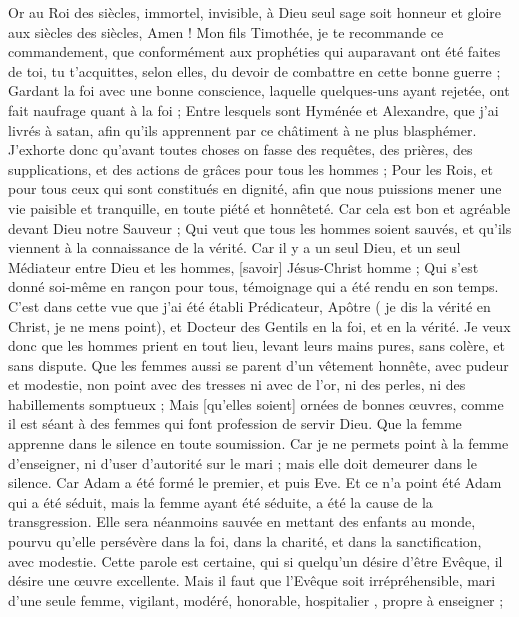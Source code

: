 \begin{multicols}{2}
Or au Roi des siècles, immortel, invisible, à Dieu seul sage soit honneur et gloire aux siècles des siècles, Amen !
Mon fils Timothée, je te recommande ce commandement, que conformément aux prophéties qui auparavant ont été faites de toi, tu t'acquittes, selon elles, du devoir de combattre en cette bonne guerre ;
Gardant la foi avec une bonne conscience, laquelle quelques-uns ayant rejetée, ont fait naufrage quant à la foi ;
Entre lesquels sont Hyménée et Alexandre, que j'ai livrés à satan, afin qu'ils apprennent par ce châtiment à ne plus blasphémer.
\VerseOne{}J'exhorte donc qu'avant toutes choses on fasse des requêtes, des prières, des supplications, et des actions de grâces pour tous les hommes ;
Pour les Rois, et pour tous ceux qui sont constitués en dignité, afin que nous puissions mener une vie paisible et tranquille, en toute piété et honnêteté.
Car cela est bon et agréable devant Dieu notre Sauveur ;
Qui veut que tous les hommes soient sauvés, et qu'ils viennent à la connaissance de la vérité.
Car il y a un seul Dieu, et un seul Médiateur entre Dieu et les hommes, [savoir] Jésus-Christ homme ;
Qui s'est donné soi-même en rançon pour tous, témoignage qui a été rendu en son temps.
C'est dans cette vue que j'ai été établi Prédicateur, Apôtre ( je dis la vérité en Christ, je ne mens point), et Docteur des Gentils en la foi, et en la vérité.
Je veux donc que les hommes prient en tout lieu, levant leurs mains pures, sans colère, et sans dispute.
Que les femmes aussi se parent d'un vêtement honnête, avec pudeur et modestie, non point avec des tresses ni avec de l'or, ni des perles, ni des habillements somptueux ;
Mais [qu'elles soient] ornées de bonnes œuvres, comme il est séant à des femmes qui font profession de servir Dieu.
Que la femme apprenne dans le silence en toute soumission.
Car je ne permets point à la femme d'enseigner, ni d'user d'autorité sur le mari ; mais elle doit demeurer dans le silence.
Car Adam a été formé le premier, et puis Eve.
Et ce n'a point été Adam qui a été séduit, mais la femme ayant été séduite, a été la cause de la transgression.
Elle sera néanmoins sauvée en mettant des enfants au monde, pourvu qu'elle persévère dans la foi, dans la charité, et dans la sanctification, avec modestie.
\VerseOne{}Cette parole est certaine, qui si quelqu'un désire d'être Evêque, il désire une œuvre excellente.
Mais il faut que l'Evêque soit irrépréhensible, mari d'une seule femme, vigilant, modéré, honorable, hospitalier , propre à enseigner ;

\end{multicols}
